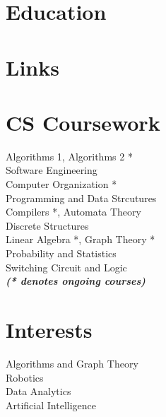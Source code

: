 \documentclass[a4paper]{deedy-resume} %
\begin{document}

\begin{minipage}[t]{0.33\textwidth} %

  \section{Education} 


    
  \section{Links} 

  
  \sectionspace

  \section{CS Coursework}
  Algorithms 1, Algorithms 2 *\\
  Software Engineering \\
  Computer Organization *\\
  Programming and Data Strcutures\\
  Compilers *, Automata Theory\\
  Discrete Structures\\
  Linear Algebra *, Graph Theory *\\
  Probability and Statistics\\
  Switching Circuit and Logic \\

  {\footnotesize \textit{\textbf{(* denotes ongoing courses) }}} \\

  \sectionspace

  \section{Interests}
  Algorithms and Graph Theory \\
  Robotics \\
  Data Analytics \\
  Artificial Intelligence \\

\end{minipage}
\end{document}
